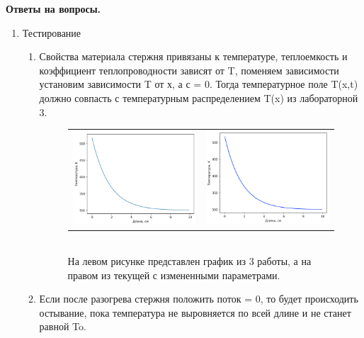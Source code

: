 \documentclass[a4paper,14pt]{extreport} %
\begin{document}
\newpage
\textbf{Ответы на вопросы. }

\begin{enumerate}
\item Тестирование

\begin{enumerate}
\item Свойства материала стержня привязаны к температуре, теплоемкость и коэффициент теплопроводности  зависят от T, поменяем зависимости установим зависимости T от х, а с = 0. Тогда температурное поле T(x,t) должно совпасть с температурным распределением T(x) из лабораторной 3. 

\begin{figure}[ht]\center
	\begin{tabular}{cc}
		\includegraphics[width=90mm]{3} & \includegraphics[width=90mm]{4}
	\end{tabular}
	\\ На левом рисунке представлен график из 3 работы, а на правом из текущей с измененными параметрами. 
\end{figure}
  
\item Если после разогрева стержня положить поток = 0, то будет происходить остывание, пока температура не выровняется по всей длине и не станет равной To.


\end{enumerate}
\end{enumerate}
\end{document}
